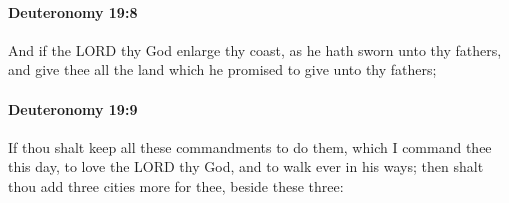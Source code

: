		\paragraph{Deuteronomy 19:8} %
			\label{DEUTERONOMY-19-8}

			And if the LORD thy God enlarge thy coast, as he hath sworn unto thy fathers, and give thee all the land which he promised to give unto thy fathers;


		\paragraph{Deuteronomy 19:9} %
			\label{DEUTERONOMY-19-9}

			If thou shalt keep all these commandments to do them, which I command thee this day, to love the LORD thy God, and to walk ever in his ways; then shalt thou add three cities more for thee, beside these three:

